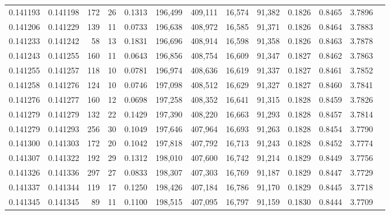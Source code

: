 \begin{tabular}{rrrrrrrrrrrrr}
0.141193 & 0.141198 &   172 &  26 &                                     0.1313 & 196,499 & 409,111 &  16,574 &  91,382 & 0.1826 & 0.8465 & 3.7896 \\
0.141206 & 0.141229 &   139 &  11 &                                     0.0733 & 196,638 & 408,972 &  16,585 &  91,371 & 0.1826 & 0.8464 & 3.7883 \\
0.141233 & 0.141242 &    58 &  13 &                                     0.1831 & 196,696 & 408,914 &  16,598 &  91,358 & 0.1826 & 0.8463 & 3.7878 \\
0.141243 & 0.141255 &   160 &  11 &                                     0.0643 & 196,856 & 408,754 &  16,609 &  91,347 & 0.1827 & 0.8462 & 3.7863 \\
0.141255 & 0.141257 &   118 &  10 &                                     0.0781 & 196,974 & 408,636 &  16,619 &  91,337 & 0.1827 & 0.8461 & 3.7852 \\
0.141258 & 0.141276 &   124 &  10 &                                     0.0746 & 197,098 & 408,512 &  16,629 &  91,327 & 0.1827 & 0.8460 & 3.7841 \\
0.141276 & 0.141277 &   160 &  12 &                                     0.0698 & 197,258 & 408,352 &  16,641 &  91,315 & 0.1828 & 0.8459 & 3.7826 \\
0.141279 & 0.141279 &   132 &  22 &                                     0.1429 & 197,390 & 408,220 &  16,663 &  91,293 & 0.1828 & 0.8457 & 3.7814 \\
0.141279 & 0.141293 &   256 &  30 &                                     0.1049 & 197,646 & 407,964 &  16,693 &  91,263 & 0.1828 & 0.8454 & 3.7790 \\
0.141300 & 0.141303 &   172 &  20 &                                     0.1042 & 197,818 & 407,792 &  16,713 &  91,243 & 0.1828 & 0.8452 & 3.7774 \\
0.141307 & 0.141322 &   192 &  29 &                                     0.1312 & 198,010 & 407,600 &  16,742 &  91,214 & 0.1829 & 0.8449 & 3.7756 \\
0.141326 & 0.141336 &   297 &  27 &                                     0.0833 & 198,307 & 407,303 &  16,769 &  91,187 & 0.1829 & 0.8447 & 3.7729 \\
0.141337 & 0.141344 &   119 &  17 &                                     0.1250 & 198,426 & 407,184 &  16,786 &  91,170 & 0.1829 & 0.8445 & 3.7718 \\
0.141345 & 0.141345 &    89 &  11 &                                     0.1100 & 198,515 & 407,095 &  16,797 &  91,159 & 0.1830 & 0.8444 & 3.7709 \\

\end{tabular}
